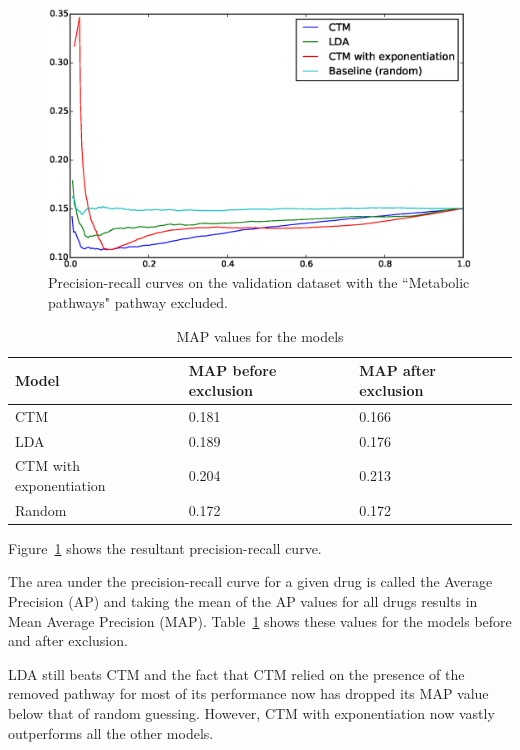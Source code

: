 \documentclass[12pt,a4paper,twoside,openright]{report}
\begin{document}
\begin{figure}[!htb]
\includegraphics[width=\textwidth]{ctd-pr-curves-no1100.eps}
\caption{Precision-recall curves on the validation dataset with the ``Metabolic pathways" pathway excluded.}
\label{fig:ctd-pr-curves-no1100}
\end{figure}


\begin{table}
	\begin{tabular}{| l | l | l |}
		\hline
		Model & MAP before exclusion & MAP after exclusion \\
		\hline
		CTM & 0.181 & 0.166 \\
		LDA & 0.189 & 0.176 \\
		CTM with exponentiation & 0.204 & 0.213 \\
		Random & 0.172 & 0.172 \\
		\hline
	\end{tabular}
	\caption{MAP values for the models}
	\label{tab:ctd-map}
\end{table}

Figure~\ref{fig:ctd-pr-curves-no1100} shows the resultant precision-recall curve. 

The area under the precision-recall curve for a given drug is called the Average Precision (AP) and taking the mean of the AP values for all drugs results in Mean Average Precision (MAP). Table~\ref{tab:ctd-map} shows these values for the models before and after exclusion.

LDA still beats CTM and the fact that CTM relied on the presence of the removed pathway for most of its performance now has dropped its MAP value below that of random guessing. However, CTM with exponentiation now vastly outperforms all the other models.
\end{document}
